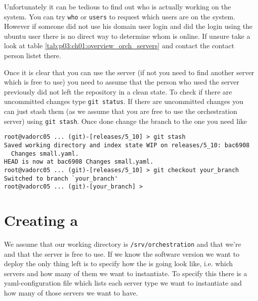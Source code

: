 	Unfortunately it can be tedious to find out who is actually working on the system. You can try \texttt{who} or \texttt{users} to request which users are on the system. However if someone did not use his domain user login and did the login using the ubuntu user there is no direct way to determine whom is online. If unsure take a look at table  \ref{tab:p03:ch01:overview_orch_servers} and contact the contact person listet there.
	
	Once it is clear that you can use the server (if not you need to find another server which is free to use) you need to assume that the person who used the server previously did not left the repository in a clean state. To check if there are uncommitted changes type
	\texttt{git status}. If there are uncommitted changes you can just stash them (as we assume that you are free to use the orchestration server) using \texttt{git stash}. Once done change the branch to the one you need like
           \begin{verbatim}
root@vadorc05 ... (git)-[releases/5_10] > git stash
Saved working directory and index state WIP on releases/5_10: bac6908 
  Changes small.yaml.
HEAD is now at bac6908 Changes small.yaml.
root@vadorc05 ... (git)-[releases/5_10] > git checkout your_branch
Switched to branch `your_branch'
root@vadorc05 ... (git)-[your_branch] >
           \end{verbatim}
	
	\section{Creating a \pod{}}
	We assume that our working directory is \texttt{/srv/orchestration} and that we're \rootuser{} and that the server is free to use. If we know the software version we want to deploy the only thing left is to specify how the \pod{} is going look like, i.e. which servers and how many of them we want to instantiate. To specify this there is a yaml-configuration file which lists each server type we want to instantiate and how many of those servers we want to have.
	
